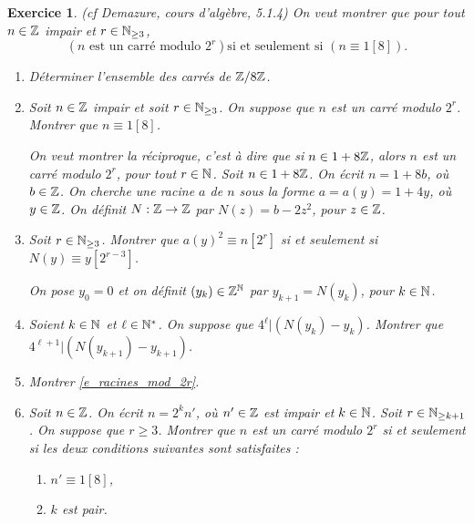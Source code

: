 \documentclass[11pt,a4paper]{article}
\newtheorem{ex}{Exercice}
\begin{document}
\begin{ex}(cf Demazure, \textit{cours d'algèbre}, 5.1.4)
On veut montrer que pour tout $n\in \mathbb{Z}$ impair et  $r\in \mathbb{N}_{\geq 3}$, \begin{equation}\label{e_racines_mod_2r}
(n\text{ est un carré modulo }2^r)\text{si et seulement si } (n\equiv 1[8]).
\end{equation} 

\begin{enumerate}
\item Déterminer l'ensemble des carrés de $\mathbb{Z}/8\mathbb{Z}$. 

\item Soit $n\in \mathbb{Z}$ impair et soit $r\in \mathbb{N}_{\geq 3}$. On suppose que $n$ est un carré modulo $2^r$. Montrer que $n\equiv 1[8]$.

On veut montrer la réciproque, c'est à dire que si $n\in 1+8\mathbb{Z}$, alors $n$ est un carré modulo $2^r$, pour tout $r\in \mathbb{N}$. Soit $n\in 1+8\mathbb{Z}$. On écrit $n=1+8b$, où $b\in \mathbb{Z}$. On cherche une racine $a$ de $n$ sous la forme $a=a(y)=1+4y$, où $y\in \mathbb{Z}$. On définit $N:\mathbb{Z}\rightarrow \mathbb{Z}$ par $N(z)=b-2z^2$, pour $z\in \mathbb{Z}$. 


\item Soit $r\in \mathbb{N}_{\geq 3}$. Montrer que $a(y)^2\equiv n[2^r]$ si et seulement si $N(y)\equiv y[2^{r-3}]$. 

On pose $y_0=0$ et on définit $(y_k)\in \mathbb{Z}^{\mathbb{N}}$ par $y_{k+1}=N(y_k)$, pour $k\in  \mathbb{N}$. 

\item Soient $k\in \mathbb{N}$ et $\ell\in \mathbb{N}^*$. On suppose que $4^\ell|(N(y_k)-y_k)$.  Montrer que $4^{\ell+1}|(N(y_{k+1})-y_{k+1})$. 

\item Montrer \eqref{e_racines_mod_2r}.

\item Soit $n\in \mathbb{Z}$. On écrit $n=2^k n'$, où $n'\in \mathbb{Z}$ est impair et $k\in \mathbb{N}$. Soit $r\in \mathbb{N}_{\geq k+1}$. On suppose que $r\geq 3$.  Montrer que  $n$ est un carré modulo $2^r$ si et seulement si  les deux conditions suivantes sont satisfaites : \begin{enumerate}
\item $n'\equiv 1 [8]$,

\item $k$ est pair.
\end{enumerate}
\end{enumerate}
\end{ex}
\end{document}
